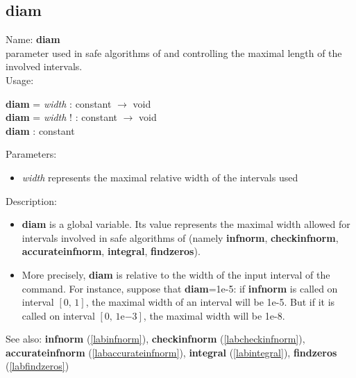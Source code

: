 \subsection{diam}
\label{labdiam}
\noindent Name: \textbf{diam}\\
parameter used in safe algorithms of \sollya and controlling the maximal length of the involved intervals.\\
\noindent Usage: 
\begin{center}
\textbf{diam} = \emph{width} : \textsf{constant} $\rightarrow$ \textsf{void}\\
\textbf{diam} = \emph{width} ! : \textsf{constant} $\rightarrow$ \textsf{void}\\
\textbf{diam} : \textsf{constant}\\
\end{center}
Parameters: 
\begin{itemize}
\item \emph{width} represents the maximal relative width of the intervals used
\end{itemize}
\noindent Description: \begin{itemize}

\item \textbf{diam} is a global variable. Its value represents the maximal width allowed
   for intervals involved in safe algorithms of \sollya (namely \textbf{infnorm},
   \textbf{checkinfnorm}, \textbf{accurateinfnorm}, \textbf{integral}, \textbf{findzeros}).

\item More precisely, \textbf{diam} is relative to the width of the input interval of
   the command. For instance, suppose that \textbf{diam}=1e-5: if \textbf{infnorm} is called
   on interval $[0,\,1]$, the maximal width of an interval will be 1e-5. But if it
   is called on interval $[0,\,1\mathrm{e}{-3}]$, the maximal width will be 1e-8.
\end{itemize}
See also: \textbf{infnorm} (\ref{labinfnorm}), \textbf{checkinfnorm} (\ref{labcheckinfnorm}), \textbf{accurateinfnorm} (\ref{labaccurateinfnorm}), \textbf{integral} (\ref{labintegral}), \textbf{findzeros} (\ref{labfindzeros})
